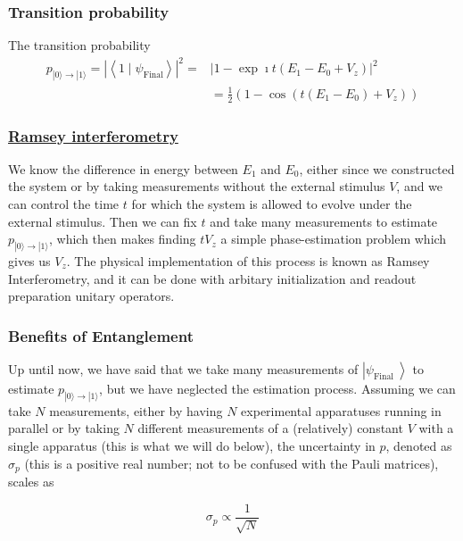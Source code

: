 \documentclass{beamer}
\begin{document}
\begin{frame}
\frametitle{Transition probability}

The transition probability
\begin{align*}
p_{|0\rangle \rightarrow|1\rangle}=\left|\left\langle 1 \mid \psi_{\mathrm{Final}}\right\rangle\right|^{2}=&\left|1-\exp{\imath t\left(E_{1}-E_{0}+ V_z\right)}\right|^{2}\\
&=\frac{1}{2}\left(1-\cos \left(t\left(E_{1}-E_{0}\right)+ V_z\right)\right)
\end{align*}
\end{frame}

\begin{frame}
\frametitle{\href{{https://en.wikipedia.org/wiki/Ramsey_interferometry}}{Ramsey interferometry}}

We know the difference in energy between $E_{1}$ and $E_{0}$, either
since we constructed the system or by taking measurements without the
external stimulus $V$, and we can control the time $t$ for which the
system is allowed to evolve under the external stimulus. Then we can
fix $t$ and take many measurements to estimate $p_{|0\rangle
\rightarrow|1\rangle}$, which then makes finding $tV_z$ a simple phase-estimation problem which gives us $
V_z$. The physical implementation of this process is known as Ramsey
Interferometry, and it can be done with arbitary initialization and
readout preparation unitary operators.
\end{frame}

\begin{frame}
\frametitle{Benefits of Entanglement}

Up until now, we have said that we take many measurements of
$\left|\psi_{\text {Final }}\right\rangle$ to estimate $p_{|0\rangle
\rightarrow|1\rangle}$, but we have neglected the estimation
process. Assuming we can take $N$ measurements, either by having $N$
experimental apparatuses running in parallel or by taking $N$
different measurements of a (relatively) constant $V$ with a single
apparatus (this is what we will do below), the uncertainty in $p$, denoted as $\sigma_{p}$ (this is a
positive real number; not to be confused with the Pauli matrices),
scales as

\[
\sigma_{p} \propto \frac{1}{\sqrt{N}}
\]
\end{frame}
\end{document}
